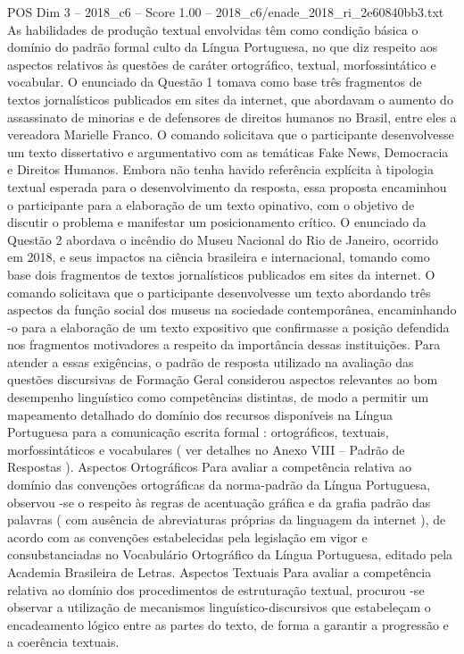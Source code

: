 \begin{textsample}{POS Dim 3 – 2018\_c6 – Score 1.00 – 2018\_c6/enade\_2018\_ri\_2e60840bb3.txt}
As habilidades de produção textual envolvidas têm como condição básica o domínio do padrão formal culto da Língua Portuguesa, no que diz respeito aos aspectos relativos às questões de caráter ortográfico, textual, morfossintático e vocabular.
O enunciado da Questão 1 tomava como base três fragmentos de textos jornalísticos publicados em sites da internet, que abordavam o aumento do assassinato de minorias e de defensores de direitos humanos no Brasil, entre eles a vereadora Marielle Franco.
O comando solicitava que o participante desenvolvesse um texto dissertativo e argumentativo com as temáticas Fake News, Democracia e Direitos Humanos.
Embora não tenha havido referência explícita à tipologia textual esperada para o desenvolvimento da resposta, essa proposta encaminhou o participante para a elaboração de um texto opinativo, com o objetivo de discutir o problema e manifestar um posicionamento crítico.
O enunciado da Questão 2 abordava o incêndio do Museu Nacional do Rio de Janeiro, ocorrido em 2018, e seus impactos na ciência brasileira e internacional, tomando como base dois fragmentos de textos jornalísticos publicados em sites da internet.
O comando solicitava que o participante desenvolvesse um texto abordando três aspectos da função social dos museus na sociedade contemporânea, encaminhando -o para a elaboração de um texto expositivo que confirmasse a posição defendida nos fragmentos motivadores a respeito da importância dessas instituições.
Para atender a essas exigências, o padrão de resposta utilizado na avaliação das questões discursivas de Formação Geral considerou aspectos relevantes ao bom desempenho linguístico como competências distintas, de modo a permitir um mapeamento detalhado do domínio dos recursos disponíveis na Língua Portuguesa para a comunicação escrita formal : ortográficos, textuais, morfossintáticos e vocabulares ( ver detalhes no Anexo VIII – Padrão de Respostas ).
Aspectos Ortográficos Para avaliar a competência relativa ao domínio das convenções ortográficas da norma-padrão da Língua Portuguesa, observou -se o respeito às regras de acentuação gráfica e da grafia padrão das palavras ( com ausência de abreviaturas próprias da linguagem da internet ), de acordo com as convenções estabelecidas pela legislação em vigor e consubstanciadas no Vocabulário Ortográfico da Língua Portuguesa, editado pela Academia Brasileira de Letras.
Aspectos Textuais Para avaliar a competência relativa ao domínio dos procedimentos de estruturação textual, procurou -se observar a utilização de mecanismos linguístico-discursivos que estabeleçam o encadeamento lógico entre as partes do texto, de forma a garantir a progressão e a coerência textuais.

\end{textsample}
